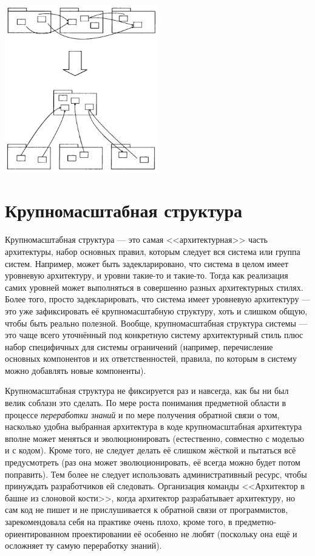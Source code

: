 \documentclass{../../text-style}
\begin{document}
\begin{center}
    \includegraphics[width=0.5\textwidth]{abstractCore.png}
\end{center}

\section{Крупномасштабная структура}

Крупномасштабная структура --- это самая <<архитектурная>> часть архитектуры, набор основных правил, которым следует вся система или группа систем. Например, может быть задекларировано, что система в целом имеет уровневую архитектуру, и уровни такие-то и такие-то. Тогда как реализация самих уровней может выполняться в совершенно разных архитектурных стилях. Более того, просто задекларировать, что система имеет уровневую архитектуру --- это уже зафиксировать её крупномасштабную структуру, хоть и слишком общую, чтобы быть реально полезной. Вообще, крупномасштабная структура системы --- это чаще всего уточнённый под конкретную систему архитектурный стиль плюс набор специфичных для системы ограничений (например, перечисление основных компонентов и их ответственностей, правила, по которым в систему можно добавлять новые компоненты).

Крупномасштабная структура не фиксируется раз и навсегда, как бы ни был велик соблазн это сделать. По мере роста понимания предметной области в процессе \textit{переработки знаний} и по мере получения обратной связи о том, насколько удобна выбранная архитектура в коде крупномасштабная архитектура вполне может меняться и эволюционировать (естественно, совместно с моделью и с кодом). Кроме того, не следует делать её слишком жёсткой и пытаться всё предусмотреть (раз она может эволюционировать, её всегда можно будет потом поправить). Тем более не следует использовать административный ресурс, чтобы принуждать разработчиков ей следовать. Организация команды <<Архитектор в башне из слоновой кости>>, когда архитектор разрабатывает архитектуру, но сам код не пишет и не прислушивается к обратной связи от программистов, зарекомендовала себя на практике очень плохо, кроме того, в предметно-ориентированном проектировании её особенно не любят (поскольку она ещё и осложняет ту самую переработку знаний).
\end{document}
